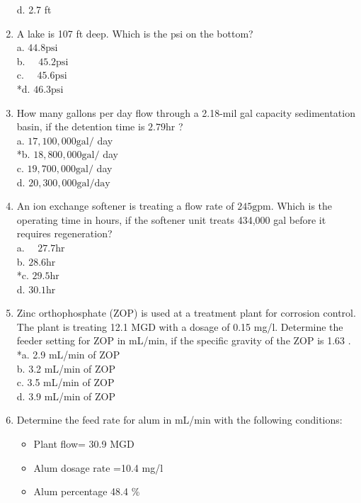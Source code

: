 \begin{enumerate}
d. 2.7 ft\\
\item A lake is 107 ft deep. Which is the psi on the bottom?\\
a. $44.8 \mathrm{psi}$\\
b. $\quad 45.2 \mathrm{psi}$\\
c. $\quad 45.6 \mathrm{psi}$\\
*d. $46.3 \mathrm{psi}$\\
\item How many gallons per day flow through a 2.18-mil gal capacity sedimentation basin, if the detention time is $2.79 \mathrm{hr}$ ?\\
a. $17,100,000 \mathrm{gal} /$ day\\
*b. $18,800,000 \mathrm{gal} /$ day\\
c. $19,700,000 \mathrm{gal} /$ day\\
d. $20,300,000 \mathrm{gal} / \mathrm{day}$\\
\item An ion exchange softener is treating a flow rate of $245 \mathrm{gpm}$. Which is the operating time in hours, if the softener unit treats 434,000 gal before it requires regeneration?\\
a. $\quad 27.7 \mathrm{hr}$\\
b. $28.6 \mathrm{hr}$\\
*c. $29.5 \mathrm{hr}$\\
d. $30.1 \mathrm{hr}$\\
\item Zinc orthophosphate (ZOP) is used at a treatment plant for corrosion control. The plant is treating 12.1 MGD with a dosage of 0.15 mg/l. Determine the feeder setting for ZOP in mL/min, if the specific gravity of the ZOP is 1.63 .\\
*a. 2.9 mL/min of ZOP\\
b. 3.2 mL/min of ZOP\\
c. 3.5 mL/min of ZOP\\
d. 3.9 mL/min of ZOP\\
\item Determine the feed rate for alum in mL/min with the following conditions:\\
\begin{itemize}
\item Plant flow= 30.9 MGD\\
\item Alum dosage rate =10.4 mg/l\\
\item Alum percentage 48.4 \%\\

\end{itemize}
\end{enumerate}
